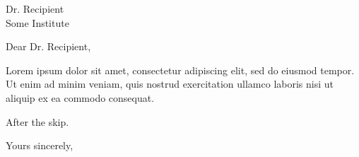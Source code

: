 \documentclass[11pt]{letter}
\date{March 3, 2025}
\begin{document}
\begin{letter}{Dr. Recipient \\ Some Institute}
\opening{Dear Dr. Recipient,}

Lorem ipsum dolor sit amet, consectetur adipiscing elit, sed do eiusmod tempor. \medskip Ut enim ad minim veniam, quis nostrud exercitation ullamco laboris nisi ut aliquip ex ea commodo consequat.

\medskip
After the skip.

\closing{Yours sincerely,}
\end{letter}
\end{document}
